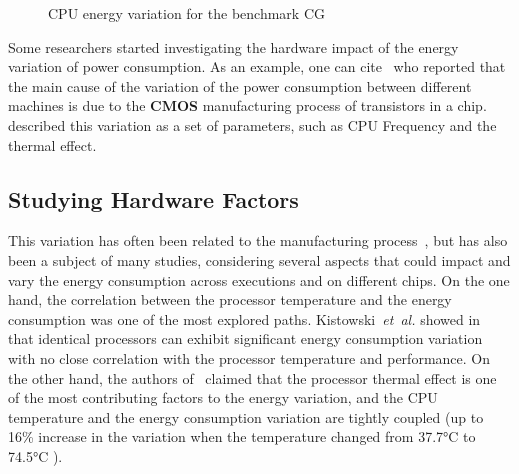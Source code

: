 \begin{figure}%
    \caption{CPU energy variation for the benchmark \textsf{CG}}\label{fig:motivation}
\end{figure}
Some researchers started investigating the hardware impact of the energy variation of power consumption.
As an example, one can cite~\cite{borkar_designing_2005,tschanz_adaptive_2002} who reported that the main cause of the variation of the power consumption between different machines is due to the \textbf{CMOS} manufacturing process of transistors in a chip.
\cite{heinrich_predicting} described this variation as a set of parameters, such as CPU Frequency and the thermal effect.
\subsection{Studying Hardware Factors}
This variation has often been related to the manufacturing process~\cite{coles_comparing_2014}, but has also been a subject of many studies, considering several aspects that could impact and vary the energy consumption across executions and on different chips.
On the one hand, the correlation between the processor temperature and the energy consumption was one of the most explored paths.
Kistowski~\emph{et~al.} showed in~\cite{joakim_v_kisroski_variations_2016} that identical processors can exhibit significant energy consumption variation with no close correlation with the processor temperature and performance.
On the other hand, the authors of~\cite{wang_potential_2018} claimed that the processor thermal effect is one of the most contributing factors to the energy variation, and the CPU temperature and the energy consumption variation are tightly coupled (up to 16\% increase in the variation when the temperature changed from 37.7°C to 74.5°C ).

